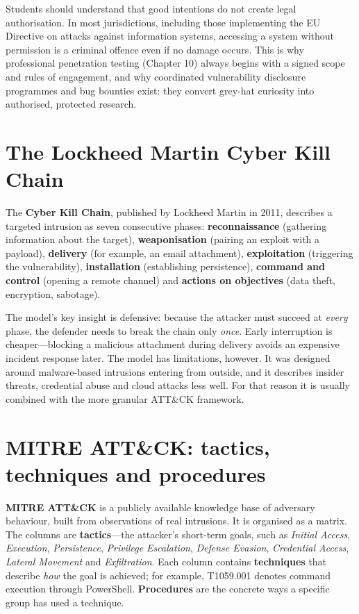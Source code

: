 \documentclass[11pt,openany]{book}
\begin{document}
Students should understand that good intentions do not create legal authorisation. In most jurisdictions, including those implementing the EU Directive on attacks against information systems, accessing a system without permission is a criminal offence even if no damage occurs. This is why professional penetration testing (Chapter 10) always begins with a signed scope and rules of engagement, and why coordinated vulnerability disclosure programmes and bug bounties exist: they convert grey-hat curiosity into authorised, protected research.

\section{The Lockheed Martin Cyber Kill Chain}\label{sec:3.3}
The \textbf{Cyber Kill Chain}, published by Lockheed Martin in 2011, describes a targeted intrusion as seven consecutive phases: \textbf{reconnaissance} (gathering information about the target), \textbf{weaponisation} (pairing an exploit with a payload), \textbf{delivery} (for example, an email attachment), \textbf{exploitation} (triggering the vulnerability), \textbf{installation} (establishing persistence), \textbf{command and control} (opening a remote channel) and \textbf{actions on objectives} (data theft, encryption, sabotage).

The model's key insight is defensive: because the attacker must succeed at \emph{every} phase, the defender needs to break the chain only \emph{once}. Early interruption is cheaper—blocking a malicious attachment during delivery avoids an expensive incident response later. The model has limitations, however. It was designed around malware-based intrusions entering from outside, and it describes insider threats, credential abuse and cloud attacks less well. For that reason it is usually combined with the more granular ATT\&CK framework.

\section{MITRE ATT\&CK: tactics, techniques and procedures}\label{sec:3.4}
\textbf{MITRE ATT\&CK} is a publicly available knowledge base of adversary behaviour, built from observations of real intrusions. It is organised as a matrix. The columns are \textbf{tactics}—the attacker's short-term goals, such as \emph{Initial Access}, \emph{Execution}, \emph{Persistence}, \emph{Privilege Escalation}, \emph{Defense Evasion}, \emph{Credential Access}, \emph{Lateral Movement} and \emph{Exfiltration}. Each column contains \textbf{techniques} that describe \emph{how} the goal is achieved; for example, T1059.001 denotes command execution through PowerShell. \textbf{Procedures} are the concrete ways a specific group has used a technique.
\end{document}
